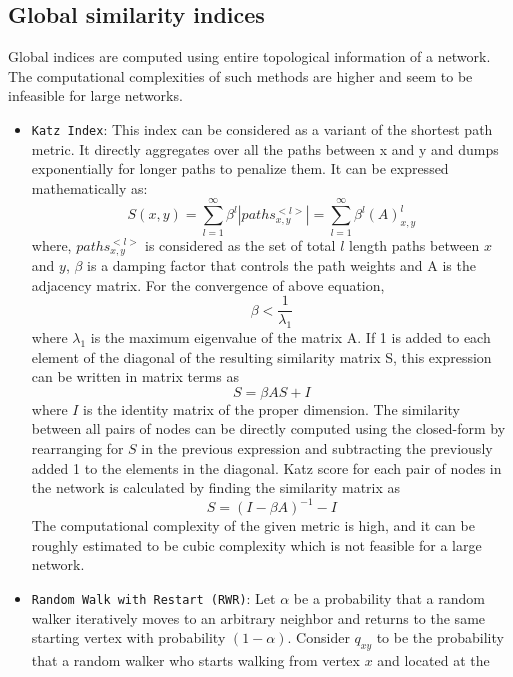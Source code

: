 \subsection{Global similarity indices}

Global indices are computed using entire topological information of a
network. The computational complexities of such methods are higher and
seem to be infeasible for large networks.

\begin{itemize}
    \item \texttt{Katz\ Index}: This
          index can be considered as a variant of the shortest path metric. It
          directly aggregates over all the paths between x and y and dumps
          exponentially for longer paths to penalize them. It can be expressed
          mathematically as:
          \[S(x, y) = \sum_{l = 1}^{\infty}\beta^l|paths_{x, y}^{<l>}| = \sum_{l = 1}^{\infty}\beta^l(A)^l_{x, y}\]
          where, \(paths_{x, y}^{<l>}\) is considered as the set of total \(l\)
          length paths between \(x\) and \(y\), \(\beta\) is a damping factor that
          controls the path weights and A is the adjacency matrix. For the
          convergence of above equation, \[\beta < \frac{1}{\lambda_1} \] where
          \(\lambda_1\) is the maximum eigenvalue of the matrix A. If 1 is added
          to each element of the diagonal of the resulting similarity matrix S,
          this expression can be written in matrix terms as \[S = \beta AS + I\]
          where \(I\) is the identity matrix of the proper dimension. The
          similarity between all pairs of nodes can be directly computed using the
          closed-form by rearranging for \(S\) in the previous expression and
          subtracting the previously added 1 to the elements in the diagonal. Katz
          score for each pair of nodes in the network is calculated by finding the
          similarity matrix as \[S = (I - \beta A)^{- 1} - I\] The computational
          complexity of the given metric is high, and it can be roughly estimated
          to be cubic complexity which is not feasible for a large network.
    \item \texttt{Random\ Walk\ with\ Restart\ (RWR)}: Let \(\alpha\) be a
          probability that a random walker iteratively moves to an arbitrary
          neighbor and returns to the same starting vertex with probability
          \((1 - \alpha)\). Consider \(q_{xy}\) to be the probability that a
          random walker who starts walking from vertex \(x\) and located at the

\end{itemize}
